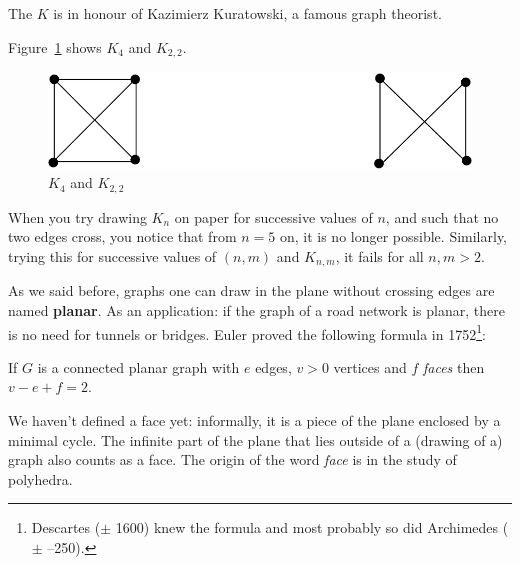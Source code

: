 The $K$ is in honour of Kazimierz Kuratowski, a famous graph theorist.

Figure~\ref{kuratowski1} shows $K_{4}$ and $K_{2,2}$.

\begin{figure}[ht]
\begin{center}
\includegraphics[width=0.4\linewidth,keepaspectratio]{kuratowski1}
\end{center}
\caption{$K_{4}$ and $K_{2,2}$ \label{kuratowski1}}
\end{figure}

When you try drawing $K_{n}$ on paper for successive values of $n$,
and such that no two edges cross, you notice that from $n=5$ on, it is
no longer possible. Similarly, trying this for successive values of
$(n,m)$ and $K_{n,m}$, it fails for all $n,m > 2$.

As we said before, graphs one can draw in the plane without crossing
edges are named \textbf{planar}. As an application: if the graph of a
road network is planar, there is no need for tunnels or bridges. Euler
proved the following formula in 1752\footnote{Descartes
($\pm$ 1600) knew the formula and most probably so did Archimedes
($\pm$ --250).}:

 \begin{theorem}
If $G$ is a connected planar graph with $e$ edges, $v > 0$ vertices and
$f$ {\em faces} then $v-e+f = 2$.
\end{theorem}

We haven't defined a face yet: informally, it is a piece of the plane
enclosed by a minimal cycle. The infinite part of the plane
that lies outside of a (drawing of a) graph also counts as a face. The
origin of the word {\em face} is in the study of polyhedra.


